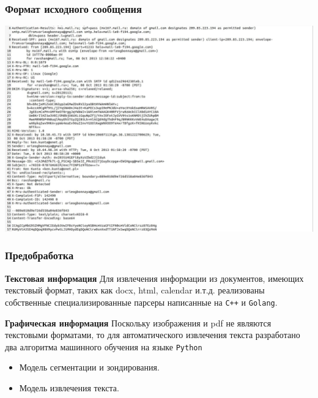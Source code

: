 \documentclass[compress,professionalfont]{beamer}
\begin{document}
\begin{frame}
\frametitle{Формат исходного сообщения}

\begin{center}
\includegraphics[width=.95\textwidth]{eml_raw.jpg}
\end{center}

\end{frame}

\begin{frame}[fragile=singleslide]
\frametitle{Предобработка}

\textbf{Текстовая информация}
Для извлечения информации из документов, имеющих текстовый формат, таких как docx, html, calendar и.т.д. реализованы собственные специализированные парсеры написанные на \verb|C++| и \verb|Golang|.
\vspace{.5cm}

\textbf{Графическая информация}
Поскольку изображения и pdf не являются текстовыми форматами, то
для автоматического извлечения текста разработано два алгоритма машинного обучения на языке \verb|Python|
\begin{itemize}
\item Модель сегментации и зондирования.
\item Модель извлечения текста.
\end{itemize}

\end{frame}
\end{document}
